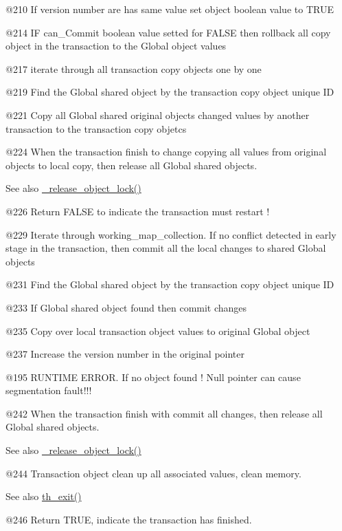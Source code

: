 @210 If version number are has same value set object boolean value to T\+R\+UE

@214 IF can\+\_\+\+Commit boolean value setted for F\+A\+L\+SE then rollback all copy object in the transaction to the Global object values

@217 iterate through all transaction copy objects one by one

@219 Find the Global shared object by the transaction copy object unique ID

@221 Copy all Global shared original objects changed values by another transaction to the transaction copy objetcs

@224 When the transaction finish to change copying all values from original objects to local copy, then release all Global shared objects. \begin{DoxySeeAlso}{See also}
\hyperlink{class_t_x_a4c13d2015dc15d0f788fa9a1413f0463_a4c13d2015dc15d0f788fa9a1413f0463}{\+\_\+release\+\_\+object\+\_\+lock()}
\end{DoxySeeAlso}
@226 Return F\+A\+L\+SE to indicate the transaction must restart !

@229 Iterate through working\+\_\+map\+\_\+collection. If no conflict detected in early stage in the transaction, then commit all the local changes to shared Global objects

@231 Find the Global shared object by the transaction copy object unique ID

@233 If Global shared object found then commit changes

@235 Copy over local transaction object values to original Global object

@237 Increase the version number in the original pointer

@195 R\+U\+N\+T\+I\+ME E\+R\+R\+OR. If no object found ! Null pointer can cause segmentation fault!!!

@242 When the transaction finish with commit all changes, then release all Global shared objects. \begin{DoxySeeAlso}{See also}
\hyperlink{class_t_x_a4c13d2015dc15d0f788fa9a1413f0463_a4c13d2015dc15d0f788fa9a1413f0463}{\+\_\+release\+\_\+object\+\_\+lock()}
\end{DoxySeeAlso}
@244 Transaction object clean up all associated values, clean memory. \begin{DoxySeeAlso}{See also}
\hyperlink{class_t_x_ae045534c4a9d39bd5c6ea2a39a372a79_ae045534c4a9d39bd5c6ea2a39a372a79}{th\+\_\+exit()}
\end{DoxySeeAlso}
@246 Return T\+R\+UE, indicate the transaction has finished. 

